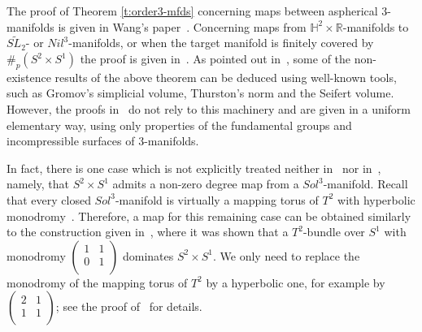 \documentclass[12pt]{amsart}
\theoremstyle{remark}
\begin{document}
The proof of Theorem \ref{t:order3-mfds} concerning maps between aspherical $3$-manifolds is given in Wang's paper~\cite{Wang:3-mfdsasp}. Concerning maps from $\mathbb{H}^2 \times {\mathbb{R}}$-manifolds to $\widetilde{SL_2}$- or $Nil^3$-manifolds, or when the target manifold is finitely covered by $\#_p(S^2\times S^1)$ the proof is given in~\cite{KotschickNeofytidis}. As pointed out in~\cite{Wang:3-mfdsasp}, some of the non-existence results of the above theorem can be deduced using well-known tools, such as Gromov's simplicial volume, Thurston's norm and the Seifert volume. However, the proofs in~\cite{Wang:3-mfdsasp} do not rely to this machinery and are given in a uniform elementary way, using only properties of the fundamental groups and incompressible surfaces of 3-manifolds. 

In fact, there is one case which is not explicitly treated neither in~\cite{Wang:3-mfdsasp} nor in~\cite{KotschickNeofytidis}, namely, that $S^2 \times S^1$ admits a non-zero degree map from a $Sol^3$-manifold. Recall that every closed $Sol^3$-manifold is virtually a mapping torus of $T^2$ with hyperbolic monodromy~\cite{Scott:3-mfds}. Therefore, a map for this remaining case can be obtained similarly to the construction given in~\cite[Prop. 6]{KotschickNeofytidis}, where it was shown that a $T^2$-bundle over $S^1$ with monodromy 
$\left( \begin{array}{cc}
  1 & 1 \\
  0 & 1 \\
\end{array} \right)$ dominates $S^2\times S^1$. We only need to replace the monodromy of the mapping torus of $T^2$ by a hyperbolic one, for example by
$\left( \begin{array}{cc}
  2 & 1 \\
  1 & 1 \\
\end{array} \right)$; see the proof of~\cite[Prop. 6]{KotschickNeofytidis} for details.
\end{document}
